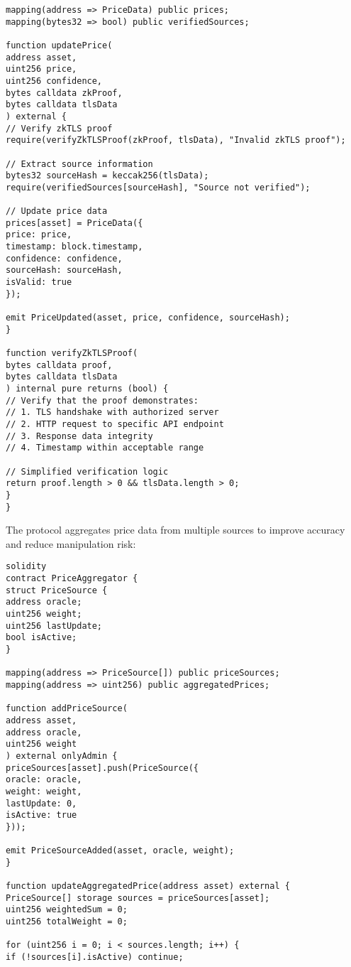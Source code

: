 \documentclass[12pt]{article}
\begin{document}
{{{\begin{lstlisting}
mapping(address => PriceData) public prices;
mapping(bytes32 => bool) public verifiedSources;

function updatePrice(
address asset,
uint256 price,
uint256 confidence,
bytes calldata zkProof,
bytes calldata tlsData
) external {
// Verify zkTLS proof
require(verifyZkTLSProof(zkProof, tlsData), "Invalid zkTLS proof");

// Extract source information
bytes32 sourceHash = keccak256(tlsData);
require(verifiedSources[sourceHash], "Source not verified");

// Update price data
prices[asset] = PriceData({
price: price,
timestamp: block.timestamp,
confidence: confidence,
sourceHash: sourceHash,
isValid: true
});

emit PriceUpdated(asset, price, confidence, sourceHash);
}

function verifyZkTLSProof(
bytes calldata proof,
bytes calldata tlsData
) internal pure returns (bool) {
// Verify that the proof demonstrates:
// 1. TLS handshake with authorized server
// 2. HTTP request to specific API endpoint
// 3. Response data integrity
// 4. Timestamp within acceptable range

// Simplified verification logic
return proof.length > 0 && tlsData.length > 0;
}
}
\end{lstlisting}


The protocol aggregates price data from multiple sources to improve accuracy and reduce manipulation risk:


\begin{lstlisting}
solidity
contract PriceAggregator {
struct PriceSource {
address oracle;
uint256 weight;
uint256 lastUpdate;
bool isActive;
}

mapping(address => PriceSource[]) public priceSources;
mapping(address => uint256) public aggregatedPrices;

function addPriceSource(
address asset,
address oracle,
uint256 weight
) external onlyAdmin {
priceSources[asset].push(PriceSource({
oracle: oracle,
weight: weight,
lastUpdate: 0,
isActive: true
}));

emit PriceSourceAdded(asset, oracle, weight);
}

function updateAggregatedPrice(address asset) external {
PriceSource[] storage sources = priceSources[asset];
uint256 weightedSum = 0;
uint256 totalWeight = 0;

for (uint256 i = 0; i < sources.length; i++) {
if (!sources[i].isActive) continue;


\end{lstlisting}}}}
\end{document}
